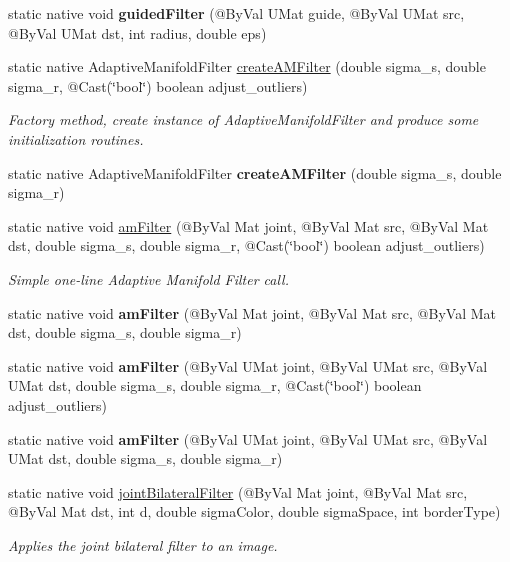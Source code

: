 \begin{DoxyCompactItemize}
\item 
static native void {\bfseries guided\+Filter} (@By\+Val U\+Mat guide, @By\+Val U\+Mat src, @By\+Val U\+Mat dst, int radius, double eps)
\item 
static native Adaptive\+Manifold\+Filter \hyperlink{group__ximgproc__filters_ga0b203de6ac4064c7dac99b1d5647b13d}{create\+A\+M\+Filter} (double sigma\+\_\+s, double sigma\+\_\+r, @Cast(\char`\"{}bool\char`\"{}) boolean adjust\+\_\+outliers)
\begin{DoxyCompactList}\small\item\em Factory method, create instance of Adaptive\+Manifold\+Filter and produce some initialization routines. \end{DoxyCompactList}\item 
static native Adaptive\+Manifold\+Filter {\bfseries create\+A\+M\+Filter} (double sigma\+\_\+s, double sigma\+\_\+r)
\item 
static native void \hyperlink{group__ximgproc__filters_ga0555fbee9503a53a6fcc0472db78f188}{am\+Filter} (@By\+Val Mat joint, @By\+Val Mat src, @By\+Val Mat dst, double sigma\+\_\+s, double sigma\+\_\+r, @Cast(\char`\"{}bool\char`\"{}) boolean adjust\+\_\+outliers)
\begin{DoxyCompactList}\small\item\em Simple one-\/line Adaptive Manifold Filter call. \end{DoxyCompactList}\item 
static native void {\bfseries am\+Filter} (@By\+Val Mat joint, @By\+Val Mat src, @By\+Val Mat dst, double sigma\+\_\+s, double sigma\+\_\+r)
\item 
static native void {\bfseries am\+Filter} (@By\+Val U\+Mat joint, @By\+Val U\+Mat src, @By\+Val U\+Mat dst, double sigma\+\_\+s, double sigma\+\_\+r, @Cast(\char`\"{}bool\char`\"{}) boolean adjust\+\_\+outliers)
\item 
static native void {\bfseries am\+Filter} (@By\+Val U\+Mat joint, @By\+Val U\+Mat src, @By\+Val U\+Mat dst, double sigma\+\_\+s, double sigma\+\_\+r)
\item 
static native void \hyperlink{group__ximgproc__filters_ga113d231f29873e22ea1778c17307a0b5}{joint\+Bilateral\+Filter} (@By\+Val Mat joint, @By\+Val Mat src, @By\+Val Mat dst, int d, double sigma\+Color, double sigma\+Space, int border\+Type)
\begin{DoxyCompactList}\small\item\em Applies the joint bilateral filter to an image. \end{DoxyCompactList}\item 

\end{DoxyCompactItemize}
